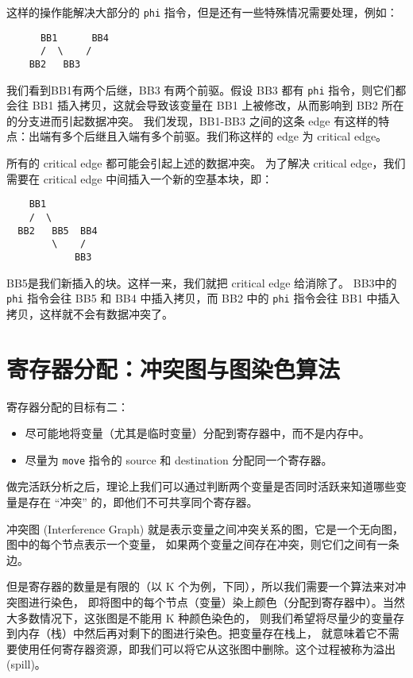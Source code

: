 这样的操作能解决大部分的 \texttt{phi} 指令，但是还有一些特殊情况需要处理，例如：
\begin{lstlisting}
      BB1      BB4
      /  \    /
    BB2   BB3
\end{lstlisting}

我们看到BB1有两个后继，BB3 有两个前驱。假设 BB3 都有 \texttt{phi} 指令，则它们都会往
BB1 插入拷贝，这就会导致该变量在 BB1 上被修改，从而影响到 BB2 所在的分支进而引起数据冲突。
我们发现，BB1-BB3 之间的这条 edge 有这样的特点：出端有多个后继且入端有多个前驱。我们称这样的
edge 为 critical edge。

所有的 critical edge 都可能会引起上述的数据冲突。
为了解决 critical edge，我们需要在 critical edge 中间插入一个新的空基本块，即：
\begin{lstlisting}
    BB1    
    /  \       
  BB2   BB5  BB4
        \    /   
            BB3     
\end{lstlisting}

BB5是我们新插入的块。这样一来，我们就把 critical edge 给消除了。
BB3中的 \texttt{phi} 指令会往 BB5 和 BB4 中插入拷贝，而 BB2 中的 \texttt{phi} 指令会往
BB1 中插入拷贝，这样就不会有数据冲突了。

\section{寄存器分配：冲突图与图染色算法}

寄存器分配的目标有二：
\begin{itemize}
    \item 尽可能地将变量（尤其是临时变量）分配到寄存器中，而不是内存中。
    \item 尽量为 \texttt{move} 指令的 source 和 destination 分配同一个寄存器。
\end{itemize}

做完活跃分析之后，理论上我们可以通过判断两个变量是否同时活跃来知道哪些变量是存在 “冲突”
的，即他们不可共享同个寄存器。

冲突图 (Interference Graph) 就是表示变量之间冲突关系的图，它是一个无向图，图中的每个节点表示一个变量，
如果两个变量之间存在冲突，则它们之间有一条边。

但是寄存器的数量是有限的（以 K 个为例，下同），所以我们需要一个算法来对冲突图进行染色，
即将图中的每个节点（变量）染上颜色（分配到寄存器中）。当然大多数情况下，这张图是不能用 K 种颜色染色的，
则我们希望将尽量少的变量存到内存（栈）中然后再对剩下的图进行染色。把变量存在栈上，
就意味着它不需要使用任何寄存器资源，即我们可以将它从这张图中删除。这个过程被称为溢出 (spill)。

